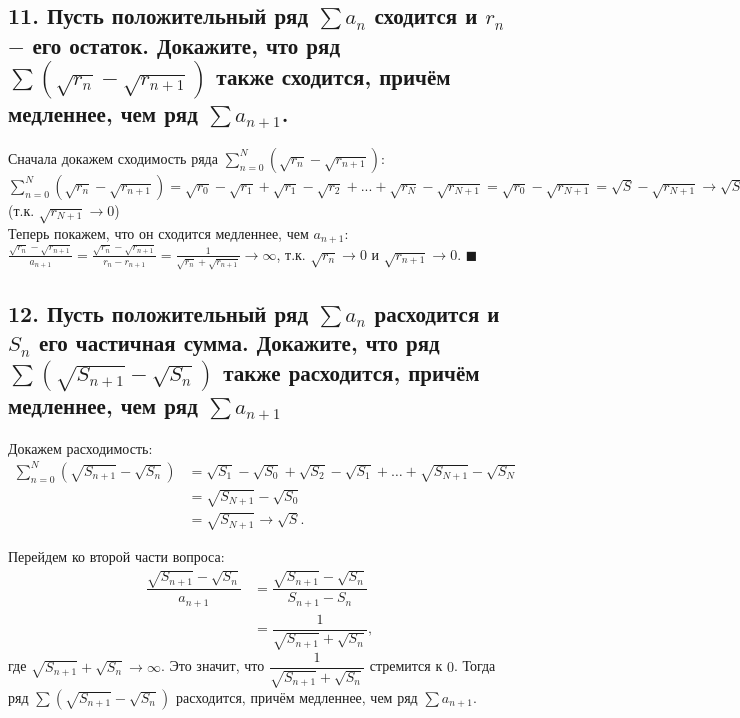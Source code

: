 \documentclass[a4paper, fleqn]{article}
\begin{document}
    \subsection*{11. Пусть положительный ряд $\sum a_n$ сходится и $r_n$ $-$ его остаток. Докажите, что ряд $\sum(\sqrt{r_n} - \sqrt{r_{n + 1}})$ также сходится, причём медленнее, чем ряд $\sum a_{n + 1}$.}
    Сначала докажем сходимость ряда $\sum\limits_{n = 0}^N (\sqrt{r_n} - \sqrt{r_{n + 1}})$:\\
    $\sum\limits_{n = 0}^N (\sqrt{r_n} - \sqrt{r_{n + 1}}) = \sqrt{r_0} - \sqrt{r_1} + \sqrt{r_1} - \sqrt{r_2} + ... + \sqrt{r_N} - \sqrt{r_{N+1}} = \sqrt{r_0} - \sqrt{r_{N+1}} = \sqrt{S} - \sqrt{r_{N+1}} \rightarrow \sqrt{S}$ (т.к. $\sqrt{r_{N+1}} \rightarrow 0$) \\
    Теперь покажем, что он сходится медленнее, чем $a_{n+1}$: \\
    $\frac{\sqrt{r_n} - \sqrt{r_{n + 1}}}{a_{n+1}} = \frac{\sqrt{r_n} - \sqrt{r_{n + 1}}}{r_n - r_{n+1}} = \frac{1}{\sqrt{r_n} + \sqrt{r_{n + 1}}} \rightarrow \infty$, т.к. $\sqrt{r_n} \rightarrow 0$ и $\sqrt{r_{n + 1}} \rightarrow 0$. $\blacksquare$ \\
    
        \subsection*{12. Пусть положительный ряд $\sum a_n$ расходится и $S_n$ его частичная сумма. Докажите, что ряд $\sum (\sqrt{S_{n+1}} - \sqrt{S_n})$ также расходится, причём медленнее, чем ряд $\sum a_{n+1}$}

        Докажем расходимость:
        \begin{align*}
            \sum_{n=0}^{N} (\sqrt{S_{n+1}} - \sqrt{S_n}) 
            &= \sqrt{S_1} - \sqrt{S_0} + \sqrt{S_2} - \sqrt{S_1} + \dots + \sqrt{S_{N+1}} - \sqrt{S_{N}} \\
            &= \sqrt{S_{N+1}} - \sqrt{S_0} \\
            &= \sqrt{S_{N+1}} \to \sqrt{S}.
        \end{align*}

        Перейдем ко второй части вопроса:
        \begin{align*}
            \dfrac{\sqrt{S_{n+1}} - \sqrt{S_n}}{a_{n+1}} 
            &= \dfrac{\sqrt{S_{n+1}} - \sqrt{S_n}}{S_{n+1} - S_n} \\
            &= \dfrac{1}{\sqrt{S_{n+1}} + \sqrt{S_n}},
        \end{align*}
        где $\sqrt{S_{n+1}} + \sqrt{S_n} \to \infty$. Это значит, что $\dfrac{1}{\sqrt{S_{n+1}} + \sqrt{S_n}}$ стремится к $0$. Тогда ряд $\sum (\sqrt{S_{n+1}} - \sqrt{S_n})$ расходится, причём медленнее, чем ряд $\sum a_{n+1}$.
\end{document}
